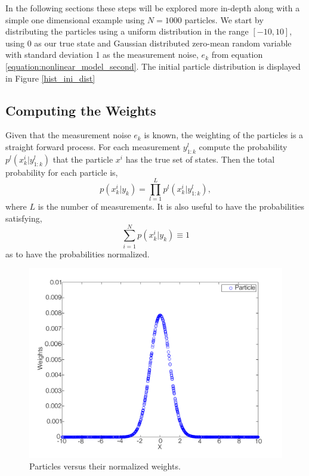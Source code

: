 \documentclass{LTHthesis}
\begin{document}
%
In the following sections these steps will be explored more in-depth along with a simple one dimensional example using $N=1000$ particles. We start by distributing the particles using a uniform distribution in the range $[-10,10]$, using $0$ as our true state and Gaussian distributed zero-mean random variable with standard deviation 1 as the measurement noise, $e_k$ from equation \ref{equation:nonlinear_model_second}. The initial particle distribution is displayed in Figure  \ref{hist_ini_dist}
%
\subsection{Computing the Weights}
%
Given that the measurement noise $e_k$ is known, the weighting of the particles is a straight forward process. For each measurement $y^l_{1:k}$ compute the probability $p^l(x^i_k|y^l_{1:k})$ that the particle $x^i$ has the true set of states. Then the total probability for each particle is,
%
\begin{equation}
p(x^i_k|y_k)=\prod_{l=1}^{L}p^l(x^i_k|y^l_{1:k}), 
\end{equation}
%
where $L$ is the number of measurements. It is also useful to have the probabilities satisfying,
%
\begin{equation}
\sum^{N}_{i=1}p(x^i_k|y_k)\equiv 1
\end{equation}
%
as to have the probabilities normalized.
%
\begin{figure}[!hbt]

\includegraphics[width=1\textwidth ]{images/PF/particle_weights}
\caption{Particles versus their normalized weights.}\label{particle_weights}
\end{figure}
\end{document}
